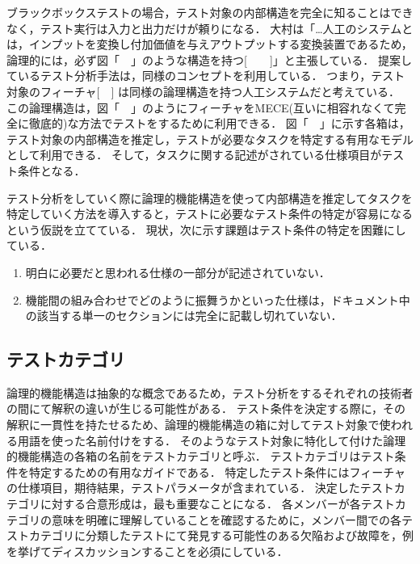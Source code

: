 ブラックボックステストの場合，テスト対象の内部構造を完全に知ることはできなく，テスト実行は入力と出力だけが頼りになる．
大村は「…人工のシステムとは，インプットを変換し付加価値を与えアウトプットする変換装置であるため，論理的には，必ず図「　」のような構造を持つ[　　]」と主張している．
提案しているテスト分析手法は，同様のコンセプトを利用している．
つまり，テスト対象のフィーチャ[　] は同様の論理構造を持つ人工システムだと考えている．
この論理構造は，図「　」のようにフィーチャをMECE(互いに相容れなくて完全に徹底的)\cite{ethan1999mckinsey}な方法でテストをするために利用できる．
図「　」に示す各箱は，テスト対象の内部構造を推定し，テストが必要なタスクを特定する有用なモデルとして利用できる．
そして，タスクに関する記述がされている仕様項目がテスト条件となる．

テスト分析をしていく際に論理的機能構造を使って内部構造を推定してタスクを特定していく方法を導入すると，テストに必要なテスト条件の特定が容易になるという仮説を立てている．
現状，次に示す課題はテスト条件の特定を困難にしている．

\begin{enumerate}
\item 明白に必要だと思われる仕様の一部分が記述されていない．
\item 機能間の組み合わせでどのように振舞うかといった仕様は，ドキュメント中の該当する単一のセクションには完全に記載し切れていない．
\end{enumerate}

\subsection{テストカテゴリ}
論理的機能構造は抽象的な概念であるため，テスト分析をするそれぞれの技術者の間にて解釈の違いが生じる可能性がある．
テスト条件を決定する際に，その解釈に一貫性を持たせるため、論理的機能構造の箱に対してテスト対象で使われる用語を使った名前付けをする．
そのようなテスト対象に特化して付けた論理的機能構造の各箱の名前をテストカテゴリと呼ぶ．
テストカテゴリはテスト条件を特定するための有用なガイドである．
特定したテスト条件にはフィーチャの仕様項目，期待結果，テストパラメータが含まれている．
決定したテストカテゴリに対する合意形成は，最も重要なことになる．
各メンバーが各テストカテゴリの意味を明確に理解していることを確認するために，メンバー間での各テストカテゴリに分類したテストにて発見する可能性のある欠陥および故障を，例を挙げてディスカッションすることを必須にしている．

